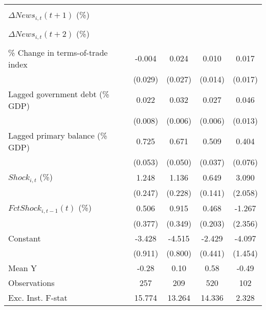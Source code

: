{\begin{tabular}{l*{4}{c}}
                    &                     &                     &                     &                     \\
\addlinespace
$ \Delta News_{i,t}(t+1)$ (\%)&                     &                     &                     &                     \\
                    &                     &                     &                     &                     \\
\addlinespace
$ \Delta News_{i,t}(t+2)$ (\%)&                     &                     &                     &                     \\
                    &                     &                     &                     &                     \\
\addlinespace
\% Change in terms-of-trade index&      -0.004         &       0.024         &       0.010         &       0.017         \\
                    &     (0.029)         &     (0.027)         &     (0.014)         &     (0.017)         \\
\addlinespace
Lagged government debt (\% GDP)&       0.022\sym{**} &       0.032\sym{***}&       0.027\sym{***}&       0.046\sym{***}\\
                    &     (0.008)         &     (0.006)         &     (0.006)         &     (0.013)         \\
\addlinespace
Lagged primary balance (\% GDP)&       0.725\sym{***}&       0.671\sym{***}&       0.509\sym{***}&       0.404\sym{***}\\
                    &     (0.053)         &     (0.050)         &     (0.037)         &     (0.076)         \\
\addlinespace
$ Shock_{i,t}$ (\%) &       1.248\sym{***}&       1.136\sym{***}&       0.649\sym{***}&       3.090         \\
                    &     (0.247)         &     (0.228)         &     (0.141)         &     (2.058)         \\
\addlinespace
$ FctShock_{i,t-1}(t)$ (\%)&       0.506         &       0.915\sym{**} &       0.468\sym{**} &      -1.267         \\
                    &     (0.377)         &     (0.349)         &     (0.203)         &     (2.356)         \\
\addlinespace
Constant            &      -3.428\sym{***}&      -4.515\sym{***}&      -2.429\sym{***}&      -4.097\sym{**} \\
                    &     (0.911)         &     (0.800)         &     (0.441)         &     (1.454)         \\
\midrule
Mean Y              &       -0.28         &        0.10         &        0.58         &       -0.49         \\
Observations        &         257         &         209         &         520         &         102         \\
Exc. Inst. F-stat   &      15.774         &      13.264         &      14.336         &       2.328         \\
\bottomrule
\end{tabular}
}

